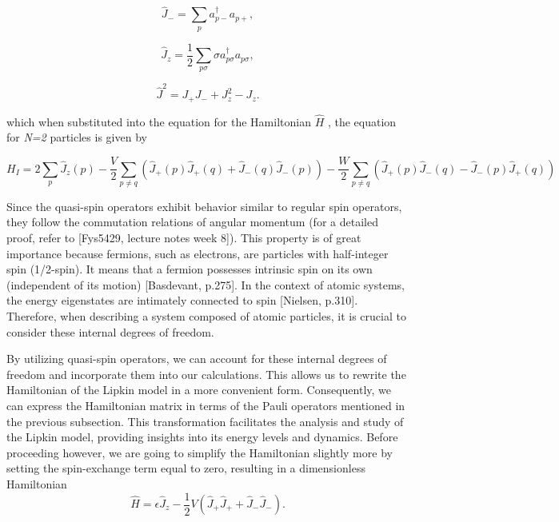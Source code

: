 \documentclass[onecolumn,10pt,cleanfoot]{asme2ej}
\begin{document}
\begin{equation}
\hat{J}_{-} = \sum_{p} a_{p-}^{\dagger}a_{p+},
\end{equation}

\begin{equation}
\hat{J}_{z} = \frac{1}{2}\sum_{p\sigma} \sigma a_{p\sigma}^{\dagger}a_{p\sigma}, 
\end{equation}

\begin{equation}
\hat{J}^{2} = J_{+}J_{-} + J_{z}^{2} - J_{z}.
\end{equation}

which when substituted into the equation for the Hamiltonian $\hat{H}$ , the equation for \textit{N=2} particles is given by

\begin{equation}
	H_I = 2\sum_{p}\hat{J}_z(p) - \frac{V}{2}\sum_{p \neq q}(\hat{J}_+(p)\hat{J}_+(q) + \hat{J}_-(q)\hat{J}_-(p)) - \frac{W}{2}\sum_{p \neq q}(\hat{J}_+(p)\hat{J}_-(q) - \hat{J}_-(p)\hat{J}_+(q))
\end{equation}

Since the quasi-spin operators exhibit behavior similar to regular spin operators, they follow the commutation relations of angular momentum (for a detailed proof, refer to [Fys5429, lecture notes week 8]). This property is of great importance because fermions, such as electrons, are particles with half-integer spin (1/2-spin). It means that a fermion possesses intrinsic spin on its own (independent of its motion) [Basdevant, p.275]. In the context of atomic systems, the energy eigenstates are intimately connected to spin [Nielsen, p.310]. Therefore, when describing a system composed of atomic particles, it is crucial to consider these internal degrees of freedom.

By utilizing quasi-spin operators, we can account for these internal degrees of freedom and incorporate them into our calculations. This allows us to rewrite the Hamiltonian of the Lipkin model in a more convenient form. Consequently, we can express the Hamiltonian matrix in terms of the Pauli operators mentioned in the previous subsection. This transformation facilitates the analysis and study of the Lipkin model, providing insights into its energy levels and dynamics. Before proceeding however, we are going to simplify the Hamiltonian slightly more by setting the spin-exchange term equal to zero, resulting in a dimensionless Hamiltonian
\begin{equation}
\hat{H} = \epsilon\hat{J}_z - \frac{1}{2}V(\hat{J}_+\hat{J}_+ + \hat{J}_-\hat{J}_-).
\end{equation}
\end{document}
